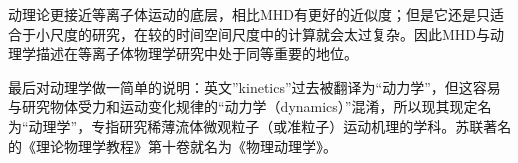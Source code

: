 动理论更接近等离子体运动的底层，相比MHD有更好的近似度；但是它还是只适合于小尺度的研究，在较的时间空间尺度中的计算就会太过复杂。因此MHD与动理学描述在等离子体物理学研究中处于同等重要的地位。
			
最后对动理学做一简单的说明：英文”kinetics”过去被翻译为“动力学”，但这容易与研究物体受力和运动变化规律的“动力学（dynamics）”混淆，所以现其现定名为“动理学”，专指研究稀薄流体微观粒子（或准粒子）运动机理的学科。苏联著名的《理论物理学教程》第十卷就名为《物理动理学》。

			






